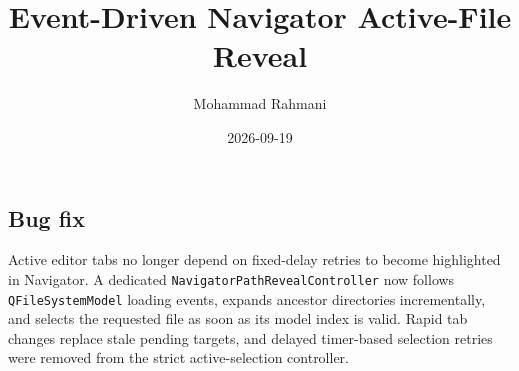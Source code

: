 \documentclass[a4paper]{article}
\title{Event-Driven Navigator Active-File Reveal}
\date{2026-09-19}
\author{Mohammad Rahmani}
\begin{document}
\maketitle

\begin{preview}
\section{Bug fix}

Active editor tabs no longer depend on fixed-delay retries to become highlighted
in Navigator. A dedicated \texttt{NavigatorPathRevealController} now follows
\texttt{QFileSystemModel} loading events, expands ancestor directories
incrementally, and selects the requested file as soon as its model index is
valid. Rapid tab changes replace stale pending targets, and delayed timer-based
selection retries were removed from the strict active-selection controller.

\end{preview}
\end{document}

